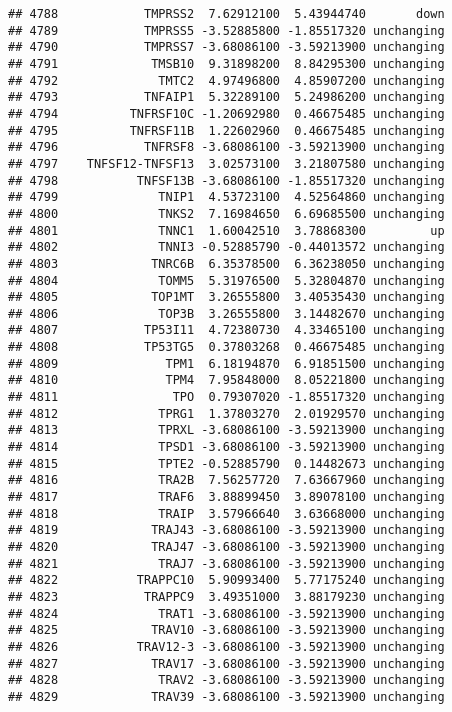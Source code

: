 \documentclass[]{article}
\begin{document}
\begin{verbatim}
## 4788            TMPRSS2  7.62912100  5.43944740       down
## 4789            TMPRSS5 -3.52885800 -1.85517320 unchanging
## 4790            TMPRSS7 -3.68086100 -3.59213900 unchanging
## 4791             TMSB10  9.31898200  8.84295300 unchanging
## 4792              TMTC2  4.97496800  4.85907200 unchanging
## 4793            TNFAIP1  5.32289100  5.24986200 unchanging
## 4794          TNFRSF10C -1.20692980  0.46675485 unchanging
## 4795          TNFRSF11B  1.22602960  0.46675485 unchanging
## 4796            TNFRSF8 -3.68086100 -3.59213900 unchanging
## 4797    TNFSF12-TNFSF13  3.02573100  3.21807580 unchanging
## 4798           TNFSF13B -3.68086100 -1.85517320 unchanging
## 4799              TNIP1  4.53723100  4.52564860 unchanging
## 4800              TNKS2  7.16984650  6.69685500 unchanging
## 4801              TNNC1  1.60042510  3.78868300         up
## 4802              TNNI3 -0.52885790 -0.44013572 unchanging
## 4803             TNRC6B  6.35378500  6.36238050 unchanging
## 4804              TOMM5  5.31976500  5.32804870 unchanging
## 4805             TOP1MT  3.26555800  3.40535430 unchanging
## 4806              TOP3B  3.26555800  3.14482670 unchanging
## 4807            TP53I11  4.72380730  4.33465100 unchanging
## 4808            TP53TG5  0.37803268  0.46675485 unchanging
## 4809               TPM1  6.18194870  6.91851500 unchanging
## 4810               TPM4  7.95848000  8.05221800 unchanging
## 4811                TPO  0.79307020 -1.85517320 unchanging
## 4812              TPRG1  1.37803270  2.01929570 unchanging
## 4813              TPRXL -3.68086100 -3.59213900 unchanging
## 4814              TPSD1 -3.68086100 -3.59213900 unchanging
## 4815              TPTE2 -0.52885790  0.14482673 unchanging
## 4816              TRA2B  7.56257720  7.63667960 unchanging
## 4817              TRAF6  3.88899450  3.89078100 unchanging
## 4818              TRAIP  3.57966640  3.63668000 unchanging
## 4819             TRAJ43 -3.68086100 -3.59213900 unchanging
## 4820             TRAJ47 -3.68086100 -3.59213900 unchanging
## 4821              TRAJ7 -3.68086100 -3.59213900 unchanging
## 4822           TRAPPC10  5.90993400  5.77175240 unchanging
## 4823            TRAPPC9  3.49351000  3.88179230 unchanging
## 4824              TRAT1 -3.68086100 -3.59213900 unchanging
## 4825             TRAV10 -3.68086100 -3.59213900 unchanging
## 4826           TRAV12-3 -3.68086100 -3.59213900 unchanging
## 4827             TRAV17 -3.68086100 -3.59213900 unchanging
## 4828              TRAV2 -3.68086100 -3.59213900 unchanging
## 4829             TRAV39 -3.68086100 -3.59213900 unchanging

\end{verbatim}
\end{document}
